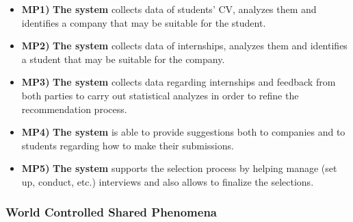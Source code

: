 \begin{itemize}
    \item \textbf{MP1)} \textbf{The system} collects data of students' CV, analyzes them and identifies a company that may be suitable for the student.
    \item \textbf{MP2)} \textbf{The system} collects data of internships, analyzes them and identifies a student that may be suitable for the company.
    \item \textbf{MP3)} \textbf{The system} collects data regarding internships and feedback from both parties to carry out statistical analyzes in order to refine the recommendation process.
    \item \textbf{MP4)} \textbf{The system} is able to provide suggestions both to companies and to students regarding how to make their submissions.
    \item \textbf{MP5)} \textbf{The system} supports the selection process by helping manage (set up, conduct, etc.) interviews and also allows to finalize the selections.
\end{itemize}

\subsubsection{World Controlled Shared Phenomena}

